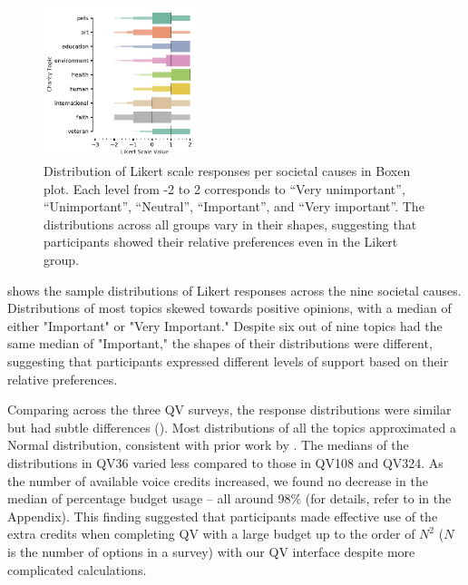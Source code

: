 \begin{figure}[htpb]
    \centering
    \includegraphics[width=0.4\textwidth, keepaspectratio=true]{content/image/likert_distribution_per_topic.pdf}
    \caption{
      Distribution of Likert scale responses per societal causes in Boxen plot. 
      Each level from -2 to 2 corresponds to 
      ``Very unimportant'', ``Unimportant'', ``Neutral'', ``Important'', and ``Very important''.
      The distributions across all groups vary in their shapes, suggesting that participants showed their relative preferences even in the Likert group.
    }
    \label{fig:likert_exp1}
\end{figure}

 shows the sample distributions of Likert responses across the nine societal causes. Distributions of most topics skewed towards positive opinions, with a median of either "Important" or "Very Important." Despite six out of nine topics had the same median of "Important," the shapes of their distributions were different, suggesting that participants expressed different levels of support based on their relative preferences. 

Comparing across the three QV surveys, the response distributions were similar but had subtle differences (). Most distributions of all the topics approximated a Normal distribution, consistent with prior work by \textcite{quarfoot2017quadratic}. The medians of the distributions in QV36 varied less compared to those in QV108 and QV324. As the number of available voice credits increased, we found no decrease in the median of percentage budget usage -- all around 98\% (for details, refer to  in the Appendix). This finding suggested that participants made effective use of the extra credits when completing QV with a large budget up to the order of $N^2$ ($N$ is the number of options in a survey) with our QV interface despite more complicated calculations. 

